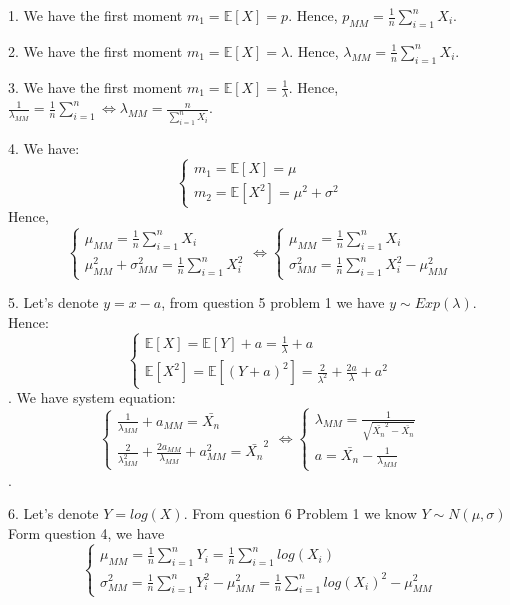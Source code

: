 \documentclass[10pt]{article}
\newenvironment{problem}[2][Problem]{\begin{trivlist}
\item[\hskip \labelsep {\bfseries #1}\hskip \labelsep {\bfseries #2.}]}{\end{trivlist}}
\begin{document}
\begin{problem}{2}
\item 1. We have the first moment $m_{1}=\mathbb{E}[X]=p$. Hence, $p_{MM}=\frac{1}{n}\sum_{i=1}^{n}X_i$.\\
\item 2. We have the first moment $m_{1}=\mathbb{E}[X]=\lambda$. Hence, $\lambda_{MM}=\frac{1}{n}\sum_{i=1}^{n}X_i$.\\
\item 3. We have the first moment $m_{1}=\mathbb{E}[X]=\frac{1}{\lambda}$. Hence, $\frac{1}{\lambda_{MM}}=\frac{1}{n}\sum_{i=1}^{n} \Leftrightarrow \lambda_{MM}=\frac{n}{\sum_{i=1}^{n}X_i}$.\\
\item 4. We have:
\[ \begin{cases} m_{1}=\mathbb{E}[X]=\mu \\ m_{2}=\mathbb{E}[X^2]=\mu^2 + \sigma^2 \end{cases}\]
Hence, 
\[ \begin{cases} \mu_{MM}=\frac{1}{n}\sum_{i=1}^{n}X_i \\ \mu_{MM}^2 + \sigma_{MM}^2 = \frac{1}{n}\sum_{i=1}^{n}X_{i}^{2} \end{cases} \Leftrightarrow \begin{cases} \mu_{MM}=\frac{1}{n}\sum_{i=1}^{n}X_i \\ \sigma_{MM}^2 = \frac{1}{n}\sum_{i=1}^{n}X_{i}^{2} - \mu_{MM}^2 \end{cases} \]
\item 5. 
Let's denote $y=x-a$, from question 5 problem 1 we have $y \sim Exp(\lambda)$. Hence: 
\[ \begin{cases} \mathbb{E}[X]=\mathbb{E}[Y]+a=\frac{1}{\lambda} + a\\
\mathbb{E}[X^2]=\mathbb{E}[(Y+a)^2]= \frac{2}{\lambda^2} + \frac{2a}{\lambda} + a^2 \end{cases}\].
We have system equation:
\[ \begin{cases} \frac{1}{\lambda_{MM}} + a_{MM}= \bar{X_n}\\
 \frac{2}{\lambda_{MM}^2} + \frac{2a_{MM}}{\lambda_{MM}} + a_{MM}^2 = \bar{X_n}^2  \end{cases}  \Leftrightarrow  \begin{cases} \lambda_{MM} = \frac{1}{\sqrt{\bar{X_n}^2- \bar{X_n}}}\\ a = \bar{X_n} - \frac{1}{\lambda_{MM}} \end{cases}\].
 
\item 6.
Let's denote $Y=log(X)$. From question 6 Problem 1 we know $Y \sim N(\mu, \sigma)$\\
Form question 4, we have 
\[  \begin{cases} \mu_{MM}=\frac{1}{n}\sum_{i=1}^{n}Y_i = \frac{1}{n}\sum_{i=1}^{n}log(X_i) \\ \sigma_{MM}^2 = \frac{1}{n}\sum_{i=1}^{n}Y_{i}^{2} - \mu_{MM}^2 = \frac{1}{n}\sum_{i=1}^{n}log(X_{i})^{2} - \mu_{MM}^2 \end{cases} \] 



\end{problem}
\end{document}

